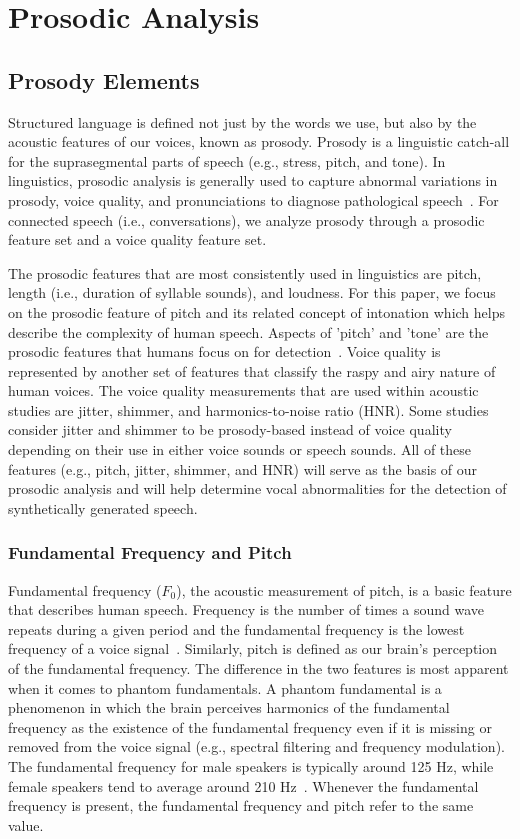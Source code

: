 \documentclass[10pt, journal, anonymous=true]{IEEEtran}
\begin{document}
\section{Prosodic Analysis} \label{sec:acoustic}

\subsection{Prosody Elements} \label{sec:elements}
Structured language is defined not just by the words we use, but also by the acoustic features of
our voices, known as prosody. 
Prosody is a linguistic catch-all for the
suprasegmental parts of speech (e.g., stress, pitch, and tone). In linguistics, prosodic analysis is generally used to capture
abnormal variations in prosody, voice quality, and pronunciations to diagnose
pathological speech~\cite{AcousticPhonetics,diehl_watson_bennetto_mcdonough_gunlogson_2009}.   For connected
speech (i.e., conversations), we analyze prosody through a prosodic feature set and a voice quality
feature set.

The prosodic features that are most consistently used in linguistics are pitch,
length (i.e., duration of syllable sounds), and loudness. For 
this paper, we focus on the prosodic feature of pitch and its
related concept of intonation which helps describe the complexity of human
speech. Aspects of 'pitch' and 'tone' are the prosodic features that humans focus on for detection~\cite{WTC_24}. Voice quality is represented by another
set of features that classify the raspy and airy nature of human voices. The voice quality
measurements that are used within acoustic studies are jitter, shimmer, and
harmonics-to-noise ratio (HNR). 
Some studies consider jitter and shimmer to be
prosody-based instead of voice quality depending on their use in either voice sounds or 
speech sounds. 
All of these features (e.g., pitch, jitter, shimmer, and HNR) will serve as the basis of our prosodic analysis and will help determine vocal abnormalities for the detection of synthetically generated speech. 

\subsubsection{Fundamental Frequency and Pitch} 
Fundamental frequency ($F_0$), the acoustic measurement of pitch, is a basic
feature that describes human speech. Frequency is the number of times a sound
wave repeats during a given period and the fundamental frequency is the lowest
frequency of a voice signal~\cite{vocal_analysis}.  Similarly, pitch is defined
as our brain's perception of the fundamental frequency. The difference in the
two features is most apparent when it comes to phantom fundamentals. A phantom
fundamental is a phenomenon in which the brain perceives harmonics of the
fundamental frequency as the existence of the fundamental frequency even if it is
missing or removed from the voice signal (e.g., spectral filtering and
frequency modulation). The fundamental frequency for male speakers is typically
around 125 Hz, while female speakers tend to average around 210
Hz~\cite{frequency_eriksson}.  Whenever the fundamental frequency is present,
the fundamental frequency and pitch refer to the same value. 
\end{document}

